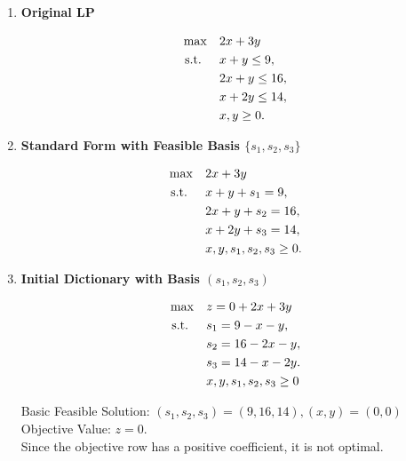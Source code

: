 \begin{enumerate}
    \item \textbf{Original LP}  
    \begin{tcolorbox}[colback=orange!5!white, colframe=orange!75!black,    
    width=0.6\textwidth, %
    box align=center, 
    title=\textbf{Linear Program to Solve}]
    \[
    \begin{aligned}
    \max \quad & 2x + 3y \\
    \mbox{ s.t. } \quad 
    & x + y \leq 9, \\
    & 2x + y \leq 16, \\
    & x + 2y \leq 14, \\
    & x, y \geq 0.
    \end{aligned}
    \]
    \end{tcolorbox}

    \item \textbf{Standard Form with Feasible Basis $\{s_1, s_2, s_3\}$}  
    \begin{tcolorbox}[colback=gray!5!white, colframe=gray!75!black,    
    width=0.6\textwidth, %
    box align=center, 
    title=\textbf{Standard Form}]
    \[
    \begin{aligned}
    \max \quad & 2x + 3y \\
    \mbox{ s.t. } \quad 
    & x + y + s_1 = 9, \\
    & 2x + y + s_2 = 16, \\
    & x + 2y + s_3 = 14, \\
    & x, y, s_1, s_2, s_3 \geq 0.
    \end{aligned}
    \]
    \end{tcolorbox}

    \item \textbf{Initial Dictionary with Basis \( (s_1, s_2, s_3) \)}
    \begin{tcolorbox}[colback=blue!5!white, colframe=blue!75!black,    
    width=0.6\textwidth, %
    box align=center, 
    title=\textbf{Initial Dictionary}]
    \[
    \begin{aligned}
    \max \quad & z = 0 + 2x + 3y \\
    \mbox{ s.t. } \quad 
    & s_1 = 9 - x - y, \\
    & s_2 = 16 - 2x - y, \\
    & s_3 = 14 - x - 2y.\\
    & x,y,s_1, s_2, s_3 \geq 0
    \end{aligned}
    \]
    \end{tcolorbox}
    Basic Feasible Solution: \( (s_1, s_2, s_3) = (9,16,14), (x,y) = (0,0) \)  
    Objective Value: \( z = 0 \).\\  
    Since the objective row has a positive coefficient, it is not optimal.
    

\end{enumerate}
